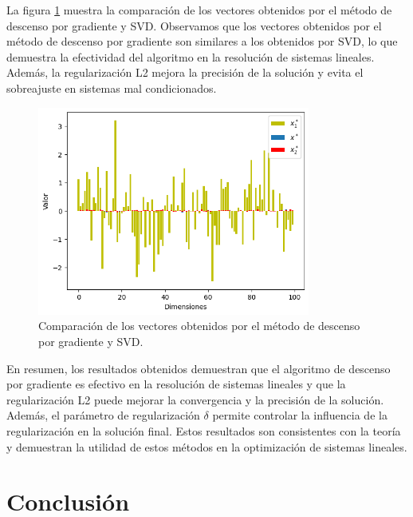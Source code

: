 \documentclass[12pt,a4]{article} %
\begin{document}
La figura \ref{fig:vectors} muestra la comparación de los vectores obtenidos por el método de descenso por gradiente y SVD. Observamos que los vectores obtenidos por el método de descenso por gradiente son similares a los obtenidos por SVD, lo que demuestra la efectividad del algoritmo en la resolución de sistemas lineales. Además, la regularización L2 mejora la precisión de la solución y evita el sobreajuste en sistemas mal condicionados.

\begin{figure}[H]
    \centering
    \includegraphics[width=0.8\textwidth]{vectors.png}
    \caption{Comparación de los vectores obtenidos por el método de descenso por gradiente y SVD.}
    \label{fig:vectors}
\end{figure}
En resumen, los resultados obtenidos demuestran que el algoritmo de descenso por gradiente es efectivo en la resolución de sistemas lineales y que la regularización L2 puede mejorar la convergencia y la precisión de la solución. Además, el parámetro de regularización \(\delta\) permite controlar la influencia de la regularización en la solución final. Estos resultados son consistentes con la teoría y demuestran la utilidad de estos métodos en la optimización de sistemas lineales.

\section{Conclusión}

\appendix




\printbibliography
\end{document}
